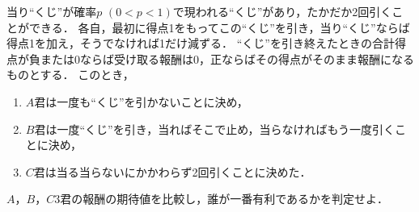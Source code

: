 \documentclass[../../main.tex]{subfiles}
\begin{document}
当り“くじ”が確率$p$ $(0<p<1)$で現われる“くじ”があり，たかだか2回引くことができる．
各自，最初に得点1をもってこの“くじ”を引き，当り“くじ”ならば得点1を加え，そうでなければ1だけ減ずる．
“くじ”を引き終えたときの合計得点が負または0ならば受け取る報酬は0，正ならばその得点がそのまま報酬になるものとする．
このとき，
\begin{enumerate}
  \item []$A$君は一度も“くじ”を引かないことに決め，
  \item []$B$君は一度“くじ”を引き，当ればそこで止め，当らなければもう一度引くことに決め，
  \item []$C$君は当る当らないにかかわらず2回引くことに決めた．
\end{enumerate}
$A$，$B$，$C$3君の報酬の期待値を比較し，誰が一番有利であるかを判定せよ．
\end{document}
